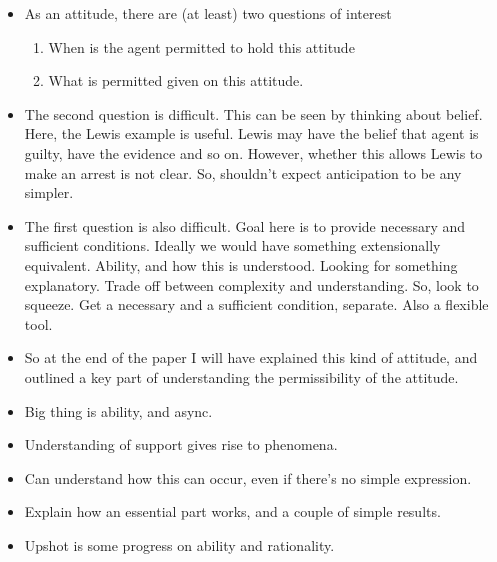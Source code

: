 \documentclass[10pt]{article}
\begin{document}
\begin{itemize}
\item As an attitude, there are (at least) two questions of interest
  \begin{enumerate}
  \item When is the agent permitted to hold this attitude
  \item What is permitted given on this attitude.
  \end{enumerate}
\item The second question is difficult.
  This can be seen by thinking about belief.
  Here, the Lewis example is useful.
  Lewis may have the belief that agent is guilty, have the evidence and so on.
  However, whether this allows Lewis to make an arrest is not clear.
  So, shouldn't expect anticipation to be any simpler.
\item The first question is also difficult.
  Goal here is to provide necessary and sufficient conditions.
  Ideally we would have something extensionally equivalent.
  Ability, and how this is understood.
  Looking for something explanatory.
  Trade off between complexity and understanding.
  So, look to squeeze.
  Get a necessary and a sufficient condition, separate.
  Also a flexible tool.
\item So at the end of the paper I will have explained this kind of attitude, and outlined a key part of understanding the permissibility of the attitude.
\item Big thing is ability, and async.
\end{itemize}

\begin{itemize}
\item Understanding of support gives rise to phenomena.
\item Can understand how this can occur, even if there's no simple expression.
\item Explain how an essential part works, and a couple of simple results.
\item Upshot is some progress on ability and rationality.
\end{itemize}
\end{document}
